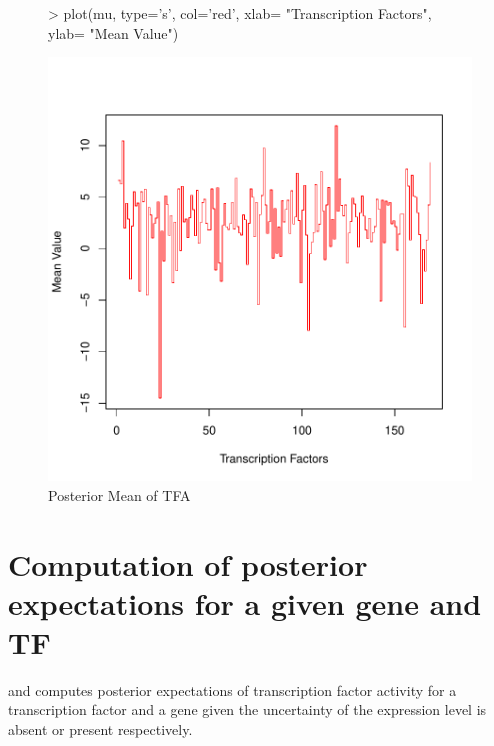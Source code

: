 \documentclass[11pt, a4paper, oneside]{article}
\begin{document}
\begin{figure}
\begin{Schunk}
\begin{Sinput}
> plot(mu, type='s', col='red', xlab= "Transcription Factors", ylab= "Mean Value")
\end{Sinput}
\end{Schunk}
\includegraphics{chipDyno-figure1}
\caption{Posterior Mean of TFA}
\label{valMin}
\end{figure}


\section{Computation of posterior expectations for a given gene and TF}
 and  computes posterior expectations of transcription factor activity for a transcription factor and a gene given the uncertainty of the expression level is absent or present respectively.
\end{document}
